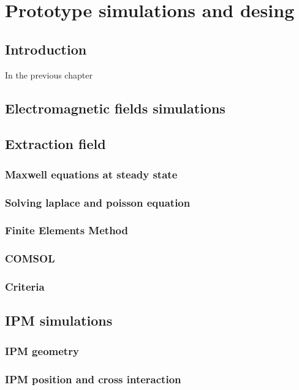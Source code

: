 \chapter{Prototype simulations and desing}
\cleardoublepage

\minitoc

\section{Introduction}
\begin{refsection}
	\label{ch3:Introduction}
	In the previous chapter

	\section{Electromagnetic fields simulations}

	\section{Extraction field}
	\subsection{Maxwell equations at steady state}
	\subsection{Solving laplace and poisson equation}
	\subsection{Finite Elements Method}
	\subsection{COMSOL}
	\subsection{Criteria}
	\section{IPM simulations}
	\subsection{IPM geometry}
	\subsection{IPM position and cross interaction}

\end{refsection}
